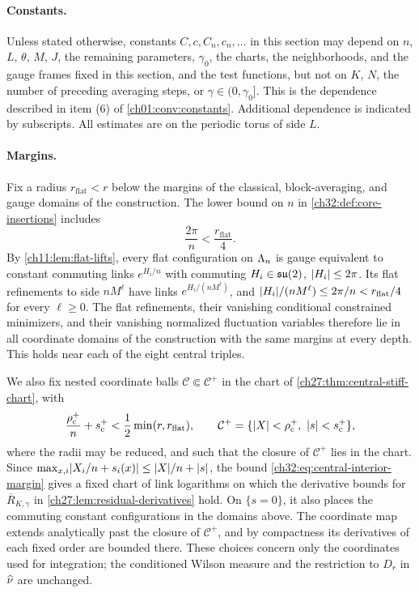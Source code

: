 \paragraph{Constants.}
Unless stated otherwise, constants $C,c,C_n,c_n,\dots$ in this section may depend on $n$, $L$, $\theta$, $M$, $J$, the remaining parameters, $\gamma_0$, the charts, the neighborhoods, and the gauge frames fixed in this section, and the test functions, but not on $K$, $N$, the number of preceding averaging steps, or $\gamma\in(0,\gamma_0]$. This is the dependence described in item (6) of \cref{ch01:conv:constants}. Additional dependence is indicated by subscripts. All estimates are on the periodic torus of side $L$.

\paragraph{Margins.}
Fix a radius $r_{\mathrm{flat}}<r$ below the margins of the classical, block-averaging, and gauge domains of the construction. The lower bound on $n$ in \cref{ch32:def:core-insertions} includes
\begin{equation}\label{ch32:eq:flat-side-margin}
 \frac{2\pi}n<\frac{r_{\mathrm{flat}}}4.
\end{equation}
By \cref{ch11:lem:flat-lifts}, every flat configuration on $\Lambda_{n}$ is gauge equivalent to constant commuting links $e^{H_i/n}$ with commuting $H_i\in\mathfrak{su}(2)$, $\lvert H_i\rvert\le2\pi$. Its flat refinements to side $nM^\ell$ have links $e^{H_i/(nM^\ell)}$, and $\lvert H_i\rvert/(nM^\ell)\le2\pi/n<r_{\mathrm{flat}}/4$ for every $\ell\ge0$. The flat refinements, their vanishing conditional constrained minimizers, and their vanishing normalized fluctuation variables therefore lie in all coordinate domains of the construction with the same margins at every depth. This holds near each of the eight central triples.

We also fix nested coordinate balls $\mathcal C\Subset\mathcal C^+$ in the chart of \cref{ch27:thm:central-stiff-chart}, with
\begin{equation}\label{ch32:eq:central-interior-margin}
 \frac{\rho_{\mathrm c}^+}n+s_{\mathrm c}^+<\frac12\min(r,r_{\mathrm{flat}}),\qquad
 \mathcal C^+=\{\lvert X\rvert<\rho_{\mathrm c}^+,\ \lvert s\rvert<s_{\mathrm c}^+\},
\end{equation}
where the radii may be reduced, and such that the closure of $\mathcal C^+$ lies in the chart. Since $\max_{x,i}\lvert X_i/n+s_i(x)\rvert\le\lvert X\rvert/n+\lvert s\rvert$, the bound \eqref{ch32:eq:central-interior-margin} gives a fixed chart of link logarithms on which the derivative bounds for $\overline R_{K,\gamma}$ in \cref{ch27:lem:residual-derivatives} hold. On $\{s=0\}$, it also places the commuting constant configurations in the domains above. The coordinate map extends analytically past the closure of $\mathcal C^+$, and by compactness its derivatives of each fixed order are bounded there. These choices concern only the coordinates used for integration; the conditioned Wilson measure and the restriction to $D_r$ in $\widehat\nu$ are unchanged.

